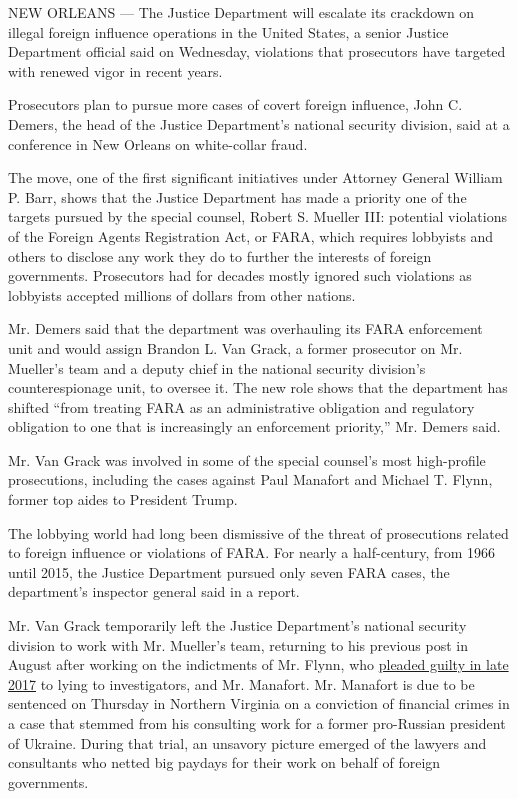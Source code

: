 NEW ORLEANS --- The Justice Department will escalate its crackdown on
illegal foreign influence operations in the United States, a senior
Justice Department official said on Wednesday, violations that
prosecutors have targeted with renewed vigor in recent years.

Prosecutors plan to pursue more cases of covert foreign influence, John
C. Demers, the head of the Justice Department's national security
division, said at a conference in New Orleans on white-collar fraud.

The move, one of the first significant initiatives under Attorney
General William P. Barr, shows that the Justice Department has made a
priority one of the targets pursued by the special counsel, Robert S.
Mueller III: potential violations of the Foreign Agents Registration
Act, or FARA, which requires lobbyists and others to disclose any work
they do to further the interests of foreign governments. Prosecutors had
for decades mostly ignored such violations as lobbyists accepted
millions of dollars from other nations.

Mr. Demers said that the department was overhauling its FARA enforcement
unit and would assign Brandon L. Van Grack, a former prosecutor on Mr.
Mueller's team and a deputy chief in the national security division's
counterespionage unit, to oversee it. The new role shows that the
department has shifted ``from treating FARA as an administrative
obligation and regulatory obligation to one that is increasingly an
enforcement priority,'' Mr. Demers said.

Mr. Van Grack was involved in some of the special counsel's most
high-profile prosecutions, including the cases against Paul Manafort and
Michael T. Flynn, former top aides to President Trump.

The lobbying world had long been dismissive of the threat of
prosecutions related to foreign influence or violations of FARA. For
nearly a half-century, from 1966 until 2015, the Justice Department
pursued only seven FARA cases, the department's inspector general said
in a report.

Mr. Van Grack temporarily left the Justice Department's national
security division to work with Mr. Mueller's team, returning to his
previous post in August after working on the indictments of Mr. Flynn,
who
\href{https://www.nytimes.com/2017/12/01/us/politics/michael-flynn-guilty-russia-investigation.html}{pleaded
guilty in late 2017} to lying to investigators, and Mr. Manafort. Mr.
Manafort is due to be sentenced on Thursday in Northern Virginia on a
conviction of financial crimes in a case that stemmed from his
consulting work for a former pro-Russian president of Ukraine. During
that trial, an unsavory picture emerged of the lawyers and consultants
who netted big paydays for their work on behalf of foreign governments.

